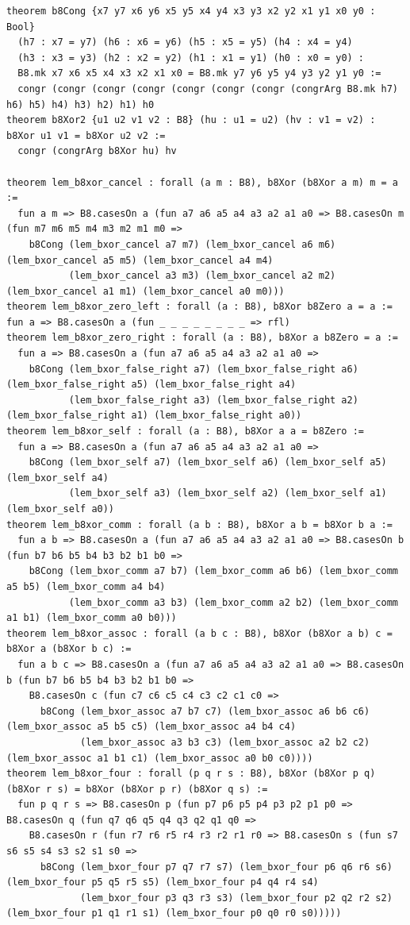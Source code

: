 \documentclass[11pt,letterpaper]{article}
\theoremstyle{spectralthm}
\begin{document}
\begin{lstlisting}[language=Lean4,caption={Standalone Pure Init.Prelude Term-Mode Lean 4 Kernel Suite (thm30--thm61, v0.0.0, 0 sorry, 0 axioms).},label={lst:lean_unified}]
theorem b8Cong {x7 y7 x6 y6 x5 y5 x4 y4 x3 y3 x2 y2 x1 y1 x0 y0 : Bool}
  (h7 : x7 = y7) (h6 : x6 = y6) (h5 : x5 = y5) (h4 : x4 = y4)
  (h3 : x3 = y3) (h2 : x2 = y2) (h1 : x1 = y1) (h0 : x0 = y0) :
  B8.mk x7 x6 x5 x4 x3 x2 x1 x0 = B8.mk y7 y6 y5 y4 y3 y2 y1 y0 :=
  congr (congr (congr (congr (congr (congr (congr (congrArg B8.mk h7) h6) h5) h4) h3) h2) h1) h0
theorem b8Xor2 {u1 u2 v1 v2 : B8} (hu : u1 = u2) (hv : v1 = v2) : b8Xor u1 v1 = b8Xor u2 v2 :=
  congr (congrArg b8Xor hu) hv

theorem lem_b8xor_cancel : forall (a m : B8), b8Xor (b8Xor a m) m = a :=
  fun a m => B8.casesOn a (fun a7 a6 a5 a4 a3 a2 a1 a0 => B8.casesOn m (fun m7 m6 m5 m4 m3 m2 m1 m0 =>
    b8Cong (lem_bxor_cancel a7 m7) (lem_bxor_cancel a6 m6) (lem_bxor_cancel a5 m5) (lem_bxor_cancel a4 m4)
           (lem_bxor_cancel a3 m3) (lem_bxor_cancel a2 m2) (lem_bxor_cancel a1 m1) (lem_bxor_cancel a0 m0)))
theorem lem_b8xor_zero_left : forall (a : B8), b8Xor b8Zero a = a := fun a => B8.casesOn a (fun _ _ _ _ _ _ _ _ => rfl)
theorem lem_b8xor_zero_right : forall (a : B8), b8Xor a b8Zero = a :=
  fun a => B8.casesOn a (fun a7 a6 a5 a4 a3 a2 a1 a0 =>
    b8Cong (lem_bxor_false_right a7) (lem_bxor_false_right a6) (lem_bxor_false_right a5) (lem_bxor_false_right a4)
           (lem_bxor_false_right a3) (lem_bxor_false_right a2) (lem_bxor_false_right a1) (lem_bxor_false_right a0))
theorem lem_b8xor_self : forall (a : B8), b8Xor a a = b8Zero :=
  fun a => B8.casesOn a (fun a7 a6 a5 a4 a3 a2 a1 a0 =>
    b8Cong (lem_bxor_self a7) (lem_bxor_self a6) (lem_bxor_self a5) (lem_bxor_self a4)
           (lem_bxor_self a3) (lem_bxor_self a2) (lem_bxor_self a1) (lem_bxor_self a0))
theorem lem_b8xor_comm : forall (a b : B8), b8Xor a b = b8Xor b a :=
  fun a b => B8.casesOn a (fun a7 a6 a5 a4 a3 a2 a1 a0 => B8.casesOn b (fun b7 b6 b5 b4 b3 b2 b1 b0 =>
    b8Cong (lem_bxor_comm a7 b7) (lem_bxor_comm a6 b6) (lem_bxor_comm a5 b5) (lem_bxor_comm a4 b4)
           (lem_bxor_comm a3 b3) (lem_bxor_comm a2 b2) (lem_bxor_comm a1 b1) (lem_bxor_comm a0 b0)))
theorem lem_b8xor_assoc : forall (a b c : B8), b8Xor (b8Xor a b) c = b8Xor a (b8Xor b c) :=
  fun a b c => B8.casesOn a (fun a7 a6 a5 a4 a3 a2 a1 a0 => B8.casesOn b (fun b7 b6 b5 b4 b3 b2 b1 b0 =>
    B8.casesOn c (fun c7 c6 c5 c4 c3 c2 c1 c0 =>
      b8Cong (lem_bxor_assoc a7 b7 c7) (lem_bxor_assoc a6 b6 c6) (lem_bxor_assoc a5 b5 c5) (lem_bxor_assoc a4 b4 c4)
             (lem_bxor_assoc a3 b3 c3) (lem_bxor_assoc a2 b2 c2) (lem_bxor_assoc a1 b1 c1) (lem_bxor_assoc a0 b0 c0))))
theorem lem_b8xor_four : forall (p q r s : B8), b8Xor (b8Xor p q) (b8Xor r s) = b8Xor (b8Xor p r) (b8Xor q s) :=
  fun p q r s => B8.casesOn p (fun p7 p6 p5 p4 p3 p2 p1 p0 => B8.casesOn q (fun q7 q6 q5 q4 q3 q2 q1 q0 =>
    B8.casesOn r (fun r7 r6 r5 r4 r3 r2 r1 r0 => B8.casesOn s (fun s7 s6 s5 s4 s3 s2 s1 s0 =>
      b8Cong (lem_bxor_four p7 q7 r7 s7) (lem_bxor_four p6 q6 r6 s6) (lem_bxor_four p5 q5 r5 s5) (lem_bxor_four p4 q4 r4 s4)
             (lem_bxor_four p3 q3 r3 s3) (lem_bxor_four p2 q2 r2 s2) (lem_bxor_four p1 q1 r1 s1) (lem_bxor_four p0 q0 r0 s0)))))


\end{lstlisting}
\end{document}
